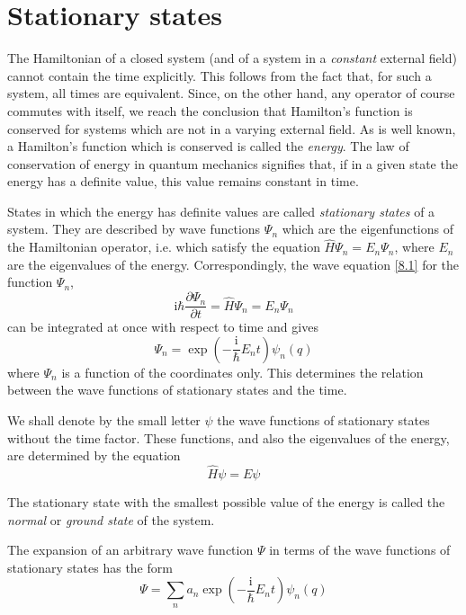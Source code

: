 \section{Stationary states}\label{Stationary states}
The Hamiltonian of a closed system (and of a system in a \textit{constant} external field) cannot contain the time explicitly. This follows from the fact that, for such a system, all times are equivalent. Since, on the other hand, any operator of course commutes with itself, we reach the conclusion that Hamilton’s function is conserved for systems which are not in a varying external field. As is well known, a Hamilton’s function which is conserved is called the \textit{energy}. The law of conservation of energy in quantum mechanics signifies that, if in a given state the energy has a definite value, this value remains constant in time.

States in which the energy has definite values are called \textit{stationary states} of a system. They are described by wave functions $ \Psi_n $ which are the eigenfunctions of the Hamiltonian operator, i.e. which satisfy the equation $ \hat{H}\Psi_n=E_n\Psi_n $, where $ E_n $ are the eigenvalues of the energy. Correspondingly, the wave equation \eqref{8.1} for the function $ \Psi_n $,
\[ \mathrm{i}\hbar\frac{\partial\Psi_n}{\partial t}=\hat{H}\Psi_n=E_n\Psi_n \]
can be integrated at once with respect to time and gives
\begin{equation}\label{10.1}
\Psi_n=\exp\left(-\frac{\mathrm{i}}{\hbar}E_nt\right)\psi_n(q)
\end{equation}
where $ \Psi_n $ is a function of the coordinates only. This determines the relation between the wave functions of stationary states and the time.

We shall denote by the small letter $ \psi $ the wave functions of stationary states without the time factor. These functions, and also the eigenvalues of the energy, are determined by the equation
\begin{equation}\label{10.2}
\hat{H}\psi=E\psi
\end{equation}


The stationary state with the smallest possible value of the energy is called the \textit{normal} or \textit{ground state} of the system.

The expansion of an arbitrary wave function $ \Psi $ in terms of the wave functions of stationary states has the form
\begin{equation}\label{10.3}
\Psi=\sum_{n}a_n\exp\left(-\frac{\mathrm{i}}{\hbar}E_nt\right)\psi_n(q)
\end{equation}


